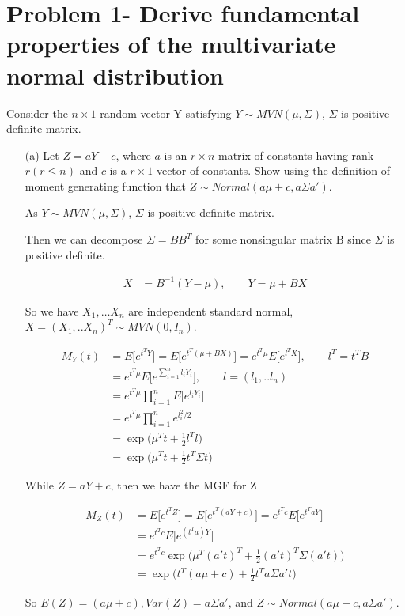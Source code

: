 
\section{Problem 1- Derive fundamental properties of the multivariate normal distribution}

Consider the $n \times 1$ random vector Y satisfying $Y \sim MVN (\mu, \Sigma)$, $\Sigma$ is positive definite matrix.

\begin{itemize}
	\item [(a)] Let $Z = aY + c$, where $a$ is an $r \times n$ matrix of constants having rank $r (r \leq n)$ and $c$ is a $r \times 1$ vector of constants. Show using the definition of moment generating function that
	$Z \sim Normal (a \mu + c, a \Sigma a')$.  
	
As $Y \sim MVN(\mu, \Sigma)$, $\Sigma$ is positive definite matrix. 

Then we can decompose $\Sigma = B B^T$ for some nonsingular matrix B since $\Sigma$ is positive definite. 

 \begin{align*}
    X &= B^{-1} (Y- \mu), \qquad Y = \mu + B X 
\end{align*}

So we have $X_1, … X_n$ are independent standard normal, $X = (X_1,.. X_n)^T \sim MVN(0, I_n)$. 

 \begin{align*}
    M_Y(t) &=  E\Big[ e^{t^T Y}\Big ]=  E\Big[ e^{t^T (\mu + B X)}\Big ] = e^{t^T \mu} E \Big[ e^{l^T X} \Big], \qquad l^T = t^T B \\
    &= e^{t^T \mu} E \Big[ e^{\sum_{i=1}^n l_i Y_i} \Big], \qquad l= (l_1,.. l_n)\\
    &= e^{t^T \mu} \prod_{i=1}^n E \Big[ e^{ l_i Y_i} \Big] \\
    &= e^{t^T \mu} \prod_{i=1}^n e^{l_i^2/2}\\
    &= \exp \Big( \mu^T t + \frac{1}{2} l^T l \Big) \\
    &= \exp \Big( \mu^T t + \frac{1}{2} t^T \Sigma t \Big)
\end{align*}

While $Z = aY + c$, then we have the MGF for Z

 \begin{align*}
    M_Z(t) &=  E\Big[ e^{t^T Z}\Big ]=  E\Big[ e^{t^T (aY + c)}\Big ] = e^{t^T c} E \Big[ e^{t^T aY} \Big] \\
    &= e^{t^T c} E \Big[ e^{ (t^T a)Y} \Big] \\
    &= e^{t^T c} \exp \Big( \mu^T (a' t)^T + \frac{1}{2} (a' t)^T \Sigma (a' t) \Big) \\
    &= \exp \Big( t^T (a \mu + c) + \frac{1}{2} t^T a \Sigma a' t \Big) 
\end{align*}	

So $E(Z) = (a \mu + c), Var(Z) = a \Sigma a'$, and $Z \sim Normal (a \mu + c, a \Sigma a')$.


\end{itemize}

